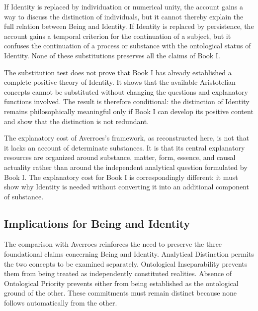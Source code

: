 If Identity is replaced by individuation
or numerical unity, the account gains
a way to discuss the distinction of
individuals, but it cannot thereby explain
the full relation between Being and Identity.
If Identity is replaced by persistence,
the account gains a temporal criterion
for the continuation of a subject, but
it confuses the continuation of a process
or substance with the ontological status
of Identity. None of these substitutions
preserves all the claims of Book I.

\label{para:VS.B01.P01.C08.S15.SS16.P003}

The substitution test does not prove that
Book I has already established a complete
positive theory of Identity. It shows
that the available Aristotelian concepts
cannot be substituted without changing
the questions and explanatory functions
involved. The result is therefore conditional:
the distinction of Identity remains
philosophically meaningful only if Book I
can develop its positive content and
show that the distinction is not redundant.

\label{para:VS.B01.P01.C08.S15.SS16.P004}

The explanatory cost of Averroes's framework,
as reconstructed here, is not that it lacks
an account of determinate substances.
It is that its central explanatory resources
are organized around substance, matter,
form, essence, and causal actuality rather
than around the independent analytical
question formulated by Book I. The
explanatory cost for Book I is correspondingly
different: it must show why Identity is
needed without converting it into an
additional component of substance.



\subsection{Implications for Being and Identity}
\label{subsec:ch08_s15_ss17}

\label{para:VS.B01.P01.C08.S15.SS17.P001}

The comparison with Averroes reinforces
the need to preserve the three foundational
claims concerning Being and Identity.
Analytical Distinction permits the two
concepts to be examined separately.
Ontological Inseparability prevents them
from being treated as independently
constituted realities. Absence of
Ontological Priority prevents either
from being established as the ontological
ground of the other. These commitments
must remain distinct because none follows
automatically from the other.

